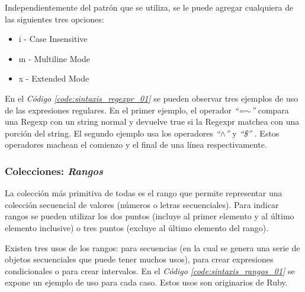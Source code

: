 \documentclass{article}
\newcommand{\refcode}[1]{\textit{Código \ref{#1}}}
\begin{document}
\noindent Independientemente del patrón que se utiliza, se le puede agregar cualquiera de las siguientes tres opciones:

\begin{itemize}
	\itemsep=1pt \topsep=0pt \partopsep=0pt \parskip=0pt \parsep=0pt
	 \item  i  - Case Insensitive
	 \item m  - Multiline Mode
	 \item x  - Extended Mode
\end{itemize}
	
\noindent En el \refcode{code:sintaxis_regexpr_01} se pueden observar tres ejemplos de uso de las expresiones regulares. En el primer ejemplo, el operador \textit{``=$\sim$''}  compara una Regexp con un string normal y devuelve true si la Regexpr matchea con una porción del string. El segundo ejemplo usa los operadores \textit{``$\wedge$''} y \textit{ ``\$''} . Estos operadores machean el comienzo y el final de una línea respectivamente.

 
\bigskip



\subsubsection{Colecciones: \textit{Rangos}}
La colección más primitiva de todas es el rango que permite representar una colección secuencial de valores (números o letras secuenciales). Para indicar rangos se pueden utilizar los dos puntos (incluye al primer elemento y al último elemento inclusive) o tres puntos (excluye al último elemento del rango).
	\par
	Existen tres usos de los rangos:  para secuencias (en la cual se genera una serie de objetos secuenciales que puede tener muchos usos), para crear expresiones condicionales o para crear intervalos. En el \refcode{code:sintaxis_rangos_01}  se expone un ejemplo de uso para cada caso. Estos usos son originarios de Ruby.

 
\bigskip\bigskip
\end{document}

